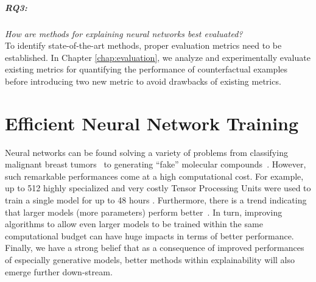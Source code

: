 \documentclass[11pt,a4paper,twoside,openright,final]{memoir}
\begin{document}
\paragraph{RQ3:} \emph{How are methods for explaining neural networks best evaluated?}\\
To identify state-of-the-art methods, proper evaluation metrics need to be established.
In Chapter \ref{chap:evaluation}, we analyze and experimentally evaluate existing metrics for quantifying the performance of counterfactual examples before introducing two new metric to avoid drawbacks of existing metrics. 



\chapter{Efficient Neural Network Training}\label{chap:nns}
Neural networks can be found solving a variety of problems from classifying malignant breast tumors~\cite{cancer} to generating ``fake'' molecular compounds~\cite{chem-gan}. 
However, such remarkable performances come at a high computational cost.
For example, up to 512 highly specialized and very costly Tensor Processing Units were used to train a single model for up to 48 hours \cite{biggan}. 
Furthermore, there is a trend indicating that larger models (more parameters) perform better~\cite{language-models-few-shot, scaling-matters}.
In turn, improving algorithms to allow even larger models to be trained within the same computational budget can have huge impacts in terms of better performance.
Finally, we have a strong belief that as a consequence of improved performances of especially generative models, better methods within explainability will also emerge further down-stream.
\end{document}
